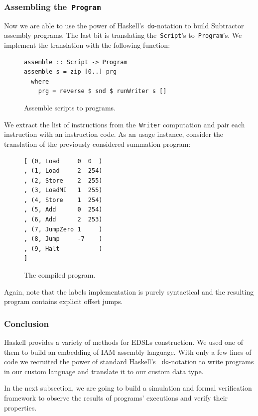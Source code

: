 \subsubsection{Assembling the~\texttt{Program}}

Now we are able to use the power of Haskell's~\texttt{do}-notation to
build Subtractor assembly programs. The last bit is translating
the~\texttt{Script}'s to~\texttt{Program}'s. We implement the
translation with the following function:

\begin{figure}[H]
\begin{verbatim}
assemble :: Script -> Program
assemble s = zip [0..] prg
  where
    prg = reverse $ snd $ runWriter s []
\end{verbatim}
\caption{Assemble scripts to programs.}
\end{figure}

We extract the list of instructions from the~\texttt{Writer} computation
and pair each instruction with an instruction code. As an usage instance, consider the
translation of the previously considered summation program:

\begin{figure}[H]
\begin{verbatim}
[ (0, Load     0  0  )
, (1, Load     2  254)
, (2, Store    2  255)
, (3, LoadMI   1  255)
, (4, Store    1  254)
, (5, Add      0  254)
, (6, Add      2  253)
, (7, JumpZero 1     )
, (8, Jump     -7    )
, (9, Halt           )
]
\end{verbatim}
\caption{The compiled program.}
\end{figure}

Again, note that the labels implementation is purely syntactical and the resulting
program contains explicit offset jumps.

\subsubsection{Conclusion}

Haskell provides a variety of methods for EDSLs construction.
We used one of them to build an embedding of IAM assembly language.
With only a few lines of code we recruited the power of standard Haskell's
~\texttt{do}-notation to write programs in our custom language and
translate it to our custom data type.

In the next subsection, we are going to build a simulation and formal verification
framework to observe the results of programs' executions and verify their properties.

